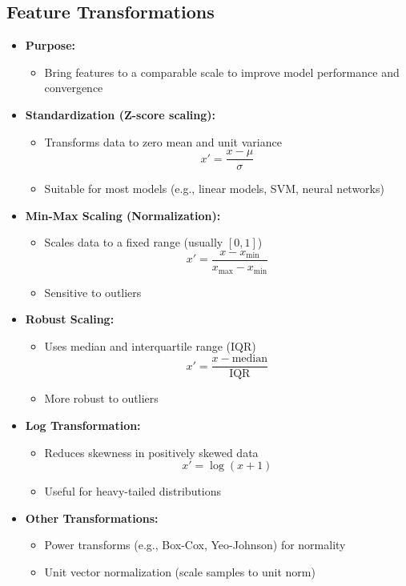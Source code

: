 \documentclass[10pt,a4paper]{article}
\begin{document}
	\subsection{Feature Transformations}
	\begin{itemize}
		\item \textbf{Purpose:}
		\begin{itemize}
			\item Bring features to a comparable scale to improve model performance and convergence
		\end{itemize}

		\item \textbf{Standardization (Z-score scaling):}
		\begin{itemize}
			\item Transforms data to zero mean and unit variance
			\[
			x' = \frac{x - \mu}{\sigma}
			\]
			\item Suitable for most models (e.g., linear models, SVM, neural networks)
		\end{itemize}

		\item \textbf{Min-Max Scaling (Normalization):}
		\begin{itemize}
			\item Scales data to a fixed range (usually $[0,1]$)
			\[
			x' = \frac{x - x_{\min}}{x_{\max} - x_{\min}}
			\]
			\item Sensitive to outliers
		\end{itemize}

		\item \textbf{Robust Scaling:}
		\begin{itemize}
			\item Uses median and interquartile range (IQR)
			\[
			x' = \frac{x - \text{median}}{\text{IQR}}
			\]
			\item More robust to outliers
		\end{itemize}

		\item \textbf{Log Transformation:}
		\begin{itemize}
			\item Reduces skewness in positively skewed data
			\[
			x' = \log(x + 1)
			\]
			\item Useful for heavy-tailed distributions
		\end{itemize}

		\item \textbf{Other Transformations:}
		\begin{itemize}
			\item Power transforms (e.g., Box-Cox, Yeo-Johnson) for normality
			\item Unit vector normalization (scale samples to unit norm)
		\end{itemize}


\end{itemize}
\end{document}
